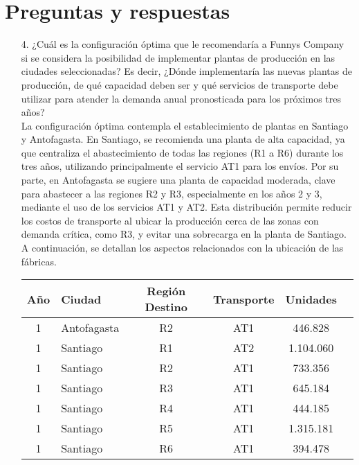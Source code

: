 \documentclass[a4paper]{article}
\begin{document}
    \newpage
    \section{Preguntas y respuestas}

    \begin{enumerate}
        \item [4.] ¿Cu\'al es la configuraci\'on \'optima que le recomendar\'ia a Funnys Company si se considera la posibilidad de implementar plantas de producci\'on en las ciudades seleccionadas? Es decir, ¿D\'onde implementar\'ia las nuevas plantas de producci\'on, de qu\'e capacidad deben ser y qu\'e servicios de transporte debe utilizar para atender la demanda anual pronosticada para los pr\'oximos tres años? \\

        La configuración óptima contempla el establecimiento de plantas en Santiago y Antofagasta. En Santiago, se recomienda una planta de alta capacidad, ya que centraliza el abastecimiento de todas las regiones (R1 a R6) durante los tres años, utilizando principalmente el servicio AT1 para los envíos. Por su parte, en Antofagasta se sugiere una planta de capacidad moderada, clave para abastecer a las regiones R2 y R3, especialmente en los años 2 y 3, mediante el uso de los servicios AT1 y AT2. Esta distribución permite reducir los costos de transporte al ubicar la producción cerca de las zonas con demanda crítica, como R3, y evitar una sobrecarga en la planta de Santiago. A continuación, se detallan los aspectos relacionados con la ubicación de las fábricas.
        \begin{table}[H]
            \centering
            \begin{tabular}{|c|l|c|c|c|r|}
            \hline
            \textbf{Año} & \textbf{Ciudad} & \textbf{Región Destino} & \textbf{Transporte} & \textbf{Unidades} \\
            \hline
            1 & Antofagasta & R2 & AT1 & 446.828 \\
            1 & Santiago    & R1 & AT2 & 1.104.060 \\
            1 & Santiago    & R2 & AT1 & 733.356 \\
            1 & Santiago    & R3 & AT1 & 645.184 \\
            1 & Santiago    & R4 & AT1 & 444.185 \\
            1 & Santiago    & R5 & AT1 & 1.315.181 \\
            1 & Santiago    & R6 & AT1 & 394.478 \\

\end{tabular}
\end{table}
\end{enumerate}
\end{document}
